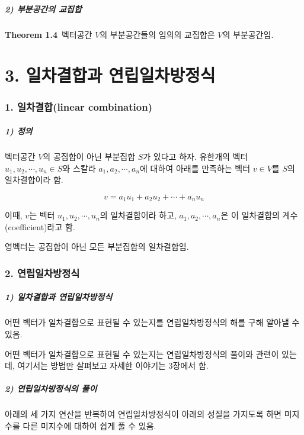 \documentclass[10pt, a4paper]{article}
\begin{document}
\subsubsection*{2) 부분공간의 교집합}

\textbf{Theorem 1.4}\, 벡터공간 $V$의 부분공간들의 임의의 교집합은 $V$의 부분공간임.\\


\newpage


\part*{3. 일차결합과 연립일차방정식}

\section*{1. 일차결합(linear combination)}

\subsubsection*{1) 정의}
벡터공간 $V$의 공집합이 아닌 부분집합 $S$가 있다고 하자. 유한개의 벡터 $u_1,u_2, \cdots ,u_n \in S$와 스칼라 $a_1,a_2, \cdots , a_n$에 대하여 아래를 만족하는 벡터 $v \in V$를 $S$의 일차결합이라 함.

\[v=a_1u_1+a_2u_2+ \cdots +a_nu_n\]

이때, $v$는 벡터 $u_1,u_2, \cdots , u_n$의 일차결합이라 하고, $a_1,a_2, \cdots , a_n$은 이 일차결합의 계수(coefficient)라고 함.

영벡터는 공집합이 아닌 모든 부분집합의 일차결합임.\\


\section*{2. 연립일차방정식}
\subsubsection*{1) 일차결합과 연립일차방정식}
어떤 벡터가 일차결합으로 표현될 수 있는지를 연립일차방정식의 해를 구해 알아낼 수 있음.

어떤 벡터가 일차결합으로 표현될 수 있는지는 연립일차방정식의 풀이와 관련이 있는데, 여기서는 방법만 살펴보고 자세한 이야기는 3장에서 함.

\subsubsection*{2) 연립일차방정식의 풀이}
아래의 세 가지 연산을 반복하여 연립일차방정식이 아래의 성질을 가지도록 하면 미지수를 다른 미지수에 대하여 쉽게 풀 수 있음.
\end{document}
